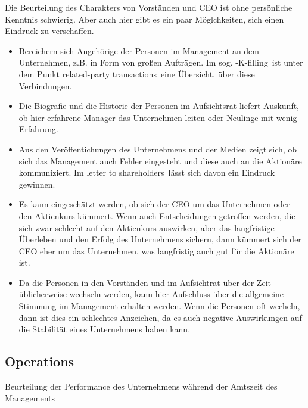 Die Beurteilung des Charakters von Vorständen und CEO ist ohne persönliche Kenntnis schwierig. 
Aber auch hier gibt es ein paar Möglchkeiten, sich einen Eindruck zu verschaffen.
\begin{itemize}
    \item Bereichern sich Angehörige der Personen im Management an dem Unternehmen, z.B. in Form von großen Aufträgen. 
        Im sog. -K-filling\grqq\ ist unter dem Punkt \glqq related-party transactions\grqq\ eine Übersicht, über diese Verbindungen.
    \item Die Biografie und die Historie der Personen im Aufsichtsrat liefert Auskunft, ob hier erfahrene Manager das Unternehmen leiten oder Neulinge mit wenig Erfahrung.
    \item Aus den Veröffentichungen des Unternehmens und der Medien zeigt sich, ob sich das Management auch Fehler eingesteht und diese auch an die Aktionäre kommuniziert.
        Im \glqq letter to shareholders\grqq\ lässt sich davon ein Eindruck gewinnen. 
    \item Es kann eingeschätzt werden, ob sich der CEO um das Unternehmen oder den Aktienkurs kümmert. 
        Wenn auch Entscheidungen getroffen werden, die sich zwar schlecht auf den Aktienkurs auswirken, aber das langfristige Überleben und den Erfolg des Unternehmens sichern, dann kümmert sich der CEO eher um das Unternehmen, was langfristig auch gut für die Aktionäre ist.
    \item Da die Personen in den Vorständen und im Aufsichtrat über der Zeit üblicherweise wechseln werden, kann hier Aufschluss über die allgemeine Stimmung im Management erhalten werden.
        Wenn die Personen oft wecheln, dann ist dies ein schlechtes Anzeichen, da es auch negative Auswirkungen auf die Stabilität eines Unternehmens haben kann.
\end{itemize}

%
\subsection{Operations}

Beurteilung der Performance des Unternehmens während der Amtszeit des Managements
